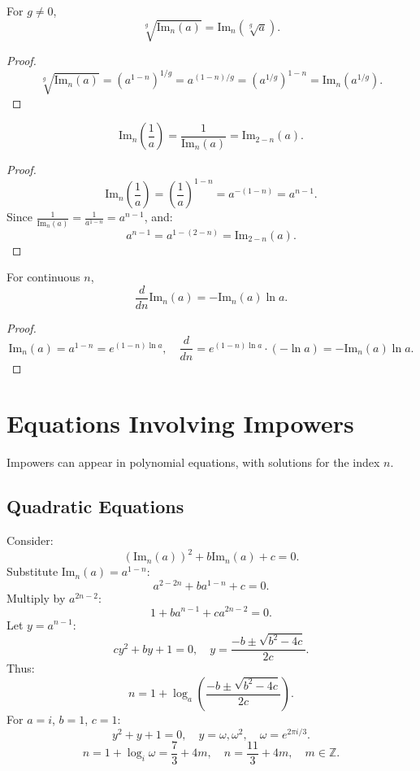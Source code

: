 \documentclass{article}
\begin{document}
\begin{theorem}
For \(g \neq 0\),
\[
\sqrt[g]{\text{Im}_n(a)} = \text{Im}_n(\sqrt[g]{a}).
\]
\end{theorem}
\begin{proof}
\[
\sqrt[g]{\text{Im}_n(a)} = (a^{1-n})^{1/g} = a^{(1-n)/g} = (a^{1/g})^{1-n} = \text{Im}_n(a^{1/g}).
\]
\end{proof}

\begin{theorem}
\[
\text{Im}_n\left(\frac{1}{a}\right) = \frac{1}{\text{Im}_n(a)} = \text{Im}_{2-n}(a).
\]
\end{theorem}
\begin{proof}
\[
\text{Im}_n\left(\frac{1}{a}\right) = \left(\frac{1}{a}\right)^{1-n} = a^{-(1-n)} = a^{n-1}.
\]
Since \(\frac{1}{\text{Im}_n(a)} = \frac{1}{a^{1-n}} = a^{n-1}\), and:
\[
a^{n-1} = a^{1-(2-n)} = \text{Im}_{2-n}(a).
\]
\end{proof}

\begin{theorem}
For continuous \(n\),
\[
\frac{d}{dn} \text{Im}_n(a) = -\text{Im}_n(a) \ln a.
\]
\end{theorem}
\begin{proof}
\[
\text{Im}_n(a) = a^{1-n} = e^{(1-n) \ln a}, \quad \frac{d}{dn} = e^{(1-n) \ln a} \cdot (-\ln a) = -\text{Im}_n(a) \ln a.
\]
\end{proof}

\section{Equations Involving Impowers}
Impowers can appear in polynomial equations, with solutions for the index \(n\).

\subsection{Quadratic Equations}
Consider:
\[
(\text{Im}_n(a))^2 + b \text{Im}_n(a) + c = 0.
\]
Substitute \(\text{Im}_n(a) = a^{1-n}\):
\[
a^{2-2n} + b a^{1-n} + c = 0.
\]
Multiply by \(a^{2n-2}\):
\[
1 + b a^{n-1} + c a^{2n-2} = 0.
\]
Let \(y = a^{n-1}\):
\[
c y^2 + b y + 1 = 0, \quad y = \frac{-b \pm \sqrt{b^2 - 4c}}{2c}.
\]
Thus:
\[
n = 1 + \log_a \left( \frac{-b \pm \sqrt{b^2 - 4c}}{2c} \right).
\]
For \(a = i\), \(b = 1\), \(c = 1\):
\[
y^2 + y + 1 = 0, \quad y = \omega, \omega^2, \quad \omega = e^{2\pi i / 3}.
\]
\[
n = 1 + \log_i \omega = \frac{7}{3} + 4m, \quad n = \frac{11}{3} + 4m, \quad m \in \mathbb{Z}.
\]
\end{document}

